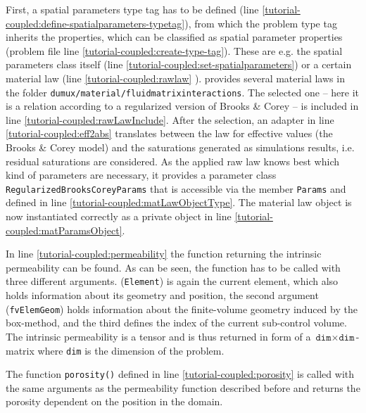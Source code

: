 First, a spatial parameters type tag has to be defined (line \ref{tutorial-coupled:define-spatialparameters-typetag}), from which the problem type tag inherits the properties, which can be classified as spatial parameter properties (problem file line \ref{tutorial-coupled:create-type-tag}). These are e.g. the spatial parameters class itself (line \ref{tutorial-coupled:set-spatialparameters}) or a certain material law  (line \ref{tutorial-coupled:rawlaw} \label{tutorial-coupled:materialLaw}). 
\Dumux provides several material laws in the folder 
\verb+dumux/material/fluidmatrixinteractions+.
The selected one -- here it is a relation according to a regularized version of Brooks \& Corey --  is included
in line \ref{tutorial-coupled:rawLawInclude}. After the selection,
an adapter in line \ref{tutorial-coupled:eff2abs} translates between the law
for effective values (the Brooks \& Corey model) and the saturations generated as simulations results, i.e. residual saturations are considered. 
As the applied raw law knows best which kind of parameters are necessary,
it provides a parameter class \texttt{RegularizedBrooksCoreyParams} that is
accessible via the member \texttt{Params} and defined in line 
\ref{tutorial-coupled:matLawObjectType}. The material law object 
is now instantiated correctly as a private object
in line \ref{tutorial-coupled:matParamsObject}.

In line \ref{tutorial-coupled:permeability} the function returning the
intrinsic permeability can be found. As can be seen, the function has
to be called with three different arguments. 
(\texttt{Element}) is again the current element, which also holds information
about its geometry and position, the second argument
(\texttt{fvElemGeom}) holds information about the finite-volume geometry induced
by the box-method, and the third defines the index of the current sub-control 
volume. The intrinsic permeability is a tensor and is thus returned in form of
a $\texttt{dim} \times \texttt{dim}$-matrix where \texttt{dim} is the dimension 
of the problem. 

The function \texttt{porosity()} defined in line
\ref{tutorial-coupled:porosity} is called with the same arguments as
the permeability function described before and returns the porosity
dependent on the position in the domain.

